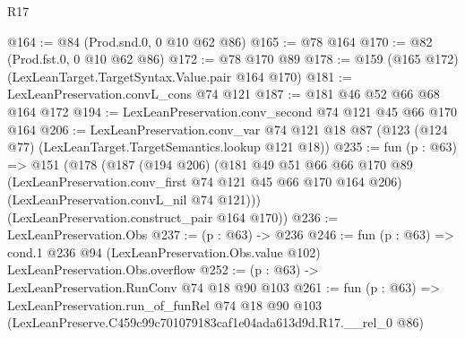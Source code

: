 \begin{lexlean}{R17}
\begin{coremodule}
@164 := @84 (Prod.snd.{0, 0} @10 @62 @86)
@165 := @78 @164
@170 := @82 (Prod.fst.{0, 0} @10 @62 @86)
@172 := @78 @170 @89
@178 := @159 (@165 @172) (LexLeanTarget.TargetSyntax.Value.pair @164 @170)
@181 := LexLeanPreservation.convL_cons @74 @121
@187 := @181 @46 @52 @66 @68 @164 @172
@194 := LexLeanPreservation.conv_second @74 @121 @45 @66 @170 @164
@206 := LexLeanPreservation.conv_var
    @74
    @121
    @18
    @87
    (@123 (@124 @77) (LexLeanTarget.TargetSemantics.lookup @121 @18))
@235 := fun (p : @63) =>
  @151
    (@178
      (@187
        (@194 @206)
        (@181
          @49
          @51
          @66
          @66
          @170
          @89
          (LexLeanPreservation.conv_first @74 @121 @45 @66 @170 @164 @206)
          (LexLeanPreservation.convL_nil @74 @121)))
      (LexLeanPreservation.construct_pair @164 @170))
@236 := LexLeanPreservation.Obs
@237 := (p : @63) -> @236
@246 := fun (p : @63) =>
  cond.{1} @236 @94 (LexLeanPreservation.Obs.value @102) LexLeanPreservation.Obs.overflow
@252 := (p : @63) -> LexLeanPreservation.RunConv @74 @18 @90 @103
@261 := fun (p : @63) =>
  LexLeanPreservation.run_of_funRel
    @74
    @18
    @90
    @103
    (LexLeanPreserve.C459c99c701079183caf1e04ada613d9d.R17.__rel_0 @86)
\end{coremodule}
\end{lexlean}
